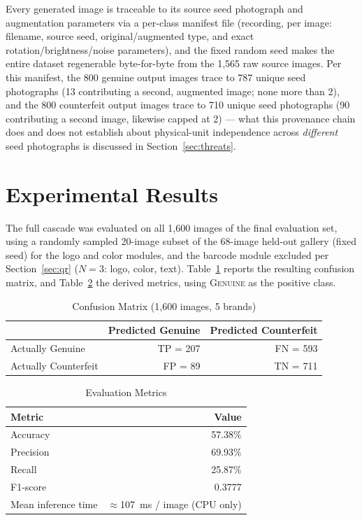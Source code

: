 \documentclass[conference]{IEEEtran}
\begin{document}
Every generated image is traceable to its source seed photograph and
augmentation parameters via a per-class manifest file (recording, per
image: filename, source seed, original/augmented type, and exact
rotation/brightness/noise parameters), and the fixed random seed makes
the entire dataset regenerable byte-for-byte from the 1{,}565 raw source
images. Per this manifest, the 800 genuine output images trace to 787
unique seed photographs (13 contributing a second, augmented image; none
more than 2), and the 800 counterfeit output images trace to 710 unique
seed photographs (90 contributing a second image, likewise capped at
2) --- what this provenance chain does and does not establish about
physical-unit independence across \emph{different} seed photographs is
discussed in Section~\ref{sec:threats}.

\section{Experimental Results}
\label{sec:results}

The full cascade was evaluated on all 1{,}600 images of the final
evaluation set, using a randomly sampled 20-image subset of the 68-image
held-out gallery (fixed seed) for the logo and color modules, and the
barcode module excluded per Section~\ref{sec:qr} ($N{=}3$: logo, color,
text). Table~\ref{tab:confusion} reports the resulting confusion matrix,
and Table~\ref{tab:metrics} the derived metrics, using \textsc{Genuine} as
the positive class.

\begin{table}[t]
\caption{Confusion Matrix (1,600 images, 5 brands)}
\label{tab:confusion}
\centering
\begin{tabular}{lrr}
\toprule
 & Predicted Genuine & Predicted Counterfeit \\
\midrule
Actually Genuine     & TP = 207 & FN = 593 \\
Actually Counterfeit & FP = 89  & TN = 711 \\
\bottomrule
\end{tabular}
\end{table}

\begin{table}[t]
\caption{Evaluation Metrics}
\label{tab:metrics}
\centering
\begin{tabular}{lr}
\toprule
Metric & Value \\
\midrule
Accuracy  & 57.38\% \\
Precision & 69.93\% \\
Recall    & 25.87\% \\
F1-score  & 0.3777 \\
Mean inference time & $\approx$107~ms / image (CPU only) \\
\bottomrule
\end{tabular}
\end{table}
\end{document}
